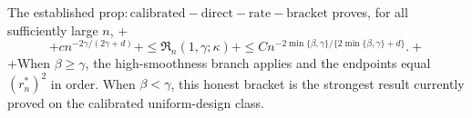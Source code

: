 The established \(\mathrm{prop:calibrated-direct-rate-bracket}\) proves, for all sufficiently large \(n\),
+\[
+c n^{-2\gamma/(2\gamma+d)}
+\le \mathfrak R_n(1,\gamma;\kappa)
+\le C n^{-2\min\{\beta,\gamma\}/\{2\min\{\beta,\gamma\}+d\}}.
+\]
+When \(\beta\ge\gamma\), the high-smoothness branch applies and the endpoints equal \((r_n^*)^2\) in order. When \(\beta<\gamma\), this honest bracket is the strongest result currently proved on the calibrated uniform-design class.